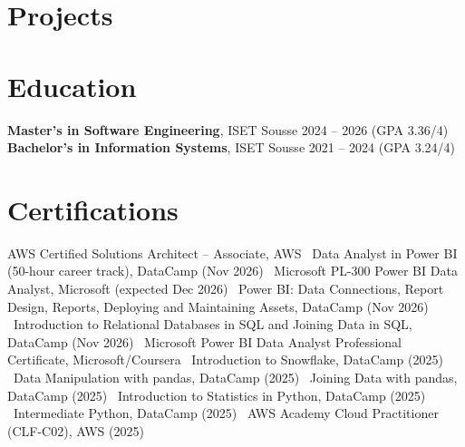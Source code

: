 \documentclass[a4paper,10pt]{article}
\begin{document}
\section*{Projects}
\pGDP
\pWeatherETL
\pAirflow
\pHive
\pEmotion

\section*{Education}
\textbf{Master's in Software Engineering}, ISET Sousse \hfill 2024 -- 2026 (GPA 3.36/4)\\
\textbf{Bachelor's in Information Systems}, ISET Sousse \hfill 2021 -- 2024 (GPA 3.24/4)

\section*{Certifications}
AWS Certified Solutions Architect -- Associate, AWS \textbar\ Data Analyst in Power BI (50-hour career track), DataCamp (Nov 2026) \textbar\ Microsoft PL-300 Power BI Data Analyst, Microsoft (expected Dec 2026) \textbar\ Power BI: Data Connections, Report Design, Reports, Deploying and Maintaining Assets, DataCamp (Nov 2026) \textbar\ Introduction to Relational Databases in SQL and Joining Data in SQL, DataCamp (Nov 2026) \textbar\ Microsoft Power BI Data Analyst Professional Certificate, Microsoft/Coursera \textbar\ Introduction to Snowflake, DataCamp (2025) \textbar\ Data Manipulation with pandas, DataCamp (2025) \textbar\ Joining Data with pandas, DataCamp (2025) \textbar\ Introduction to Statistics in Python, DataCamp (2025) \textbar\ Intermediate Python, DataCamp (2025) \textbar\ AWS Academy Cloud Practitioner (CLF-C02), AWS (2025)
\end{document}
